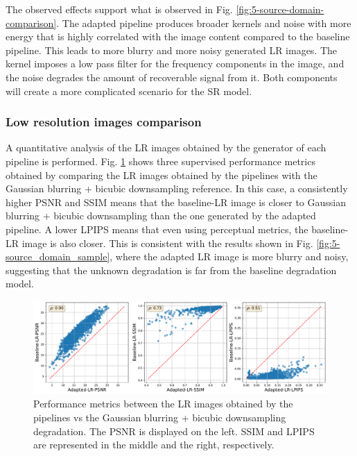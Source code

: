         

        The observed effects support what is observed in Fig. \ref{fig:5-source-domain-comparison}. 
        The adapted pipeline produces broader kernels and noise with more energy that is highly correlated with the image content compared to the baseline pipeline.
        This leads to more blurry and more noisy generated LR images. 
        The kernel imposes a low pass filter for the frequency components in the image, and the noise degrades the amount of recoverable signal from it.
        Both components will create a more complicated scenario for the SR model. 

        \subsubsection{Low resolution images comparison} \label{subsec:results-lr-comparison}

        A quantitative analysis of the LR images obtained by the generator of each pipeline is performed. 
        Fig. \ref{fig:5-source-domain-lr-performance-scatterplot} shows three supervised performance metrics obtained by comparing the LR images obtained by the pipelines with the Gaussian blurring + bicubic downsampling reference.
        In this case, a consistently higher PSNR and SSIM means that the baseline-LR image is closer to Gaussian blurring + bicubic downsampling than the one generated by the adapted pipeline. 
        A lower LPIPS means that even using perceptual metrics, the baseline-LR image is also closer.
        This is consistent with the results shown in Fig. \ref{fig:5-source_domain_sample}, where the adapted LR image is more blurry and noisy, suggesting that the unknown degradation is far from the baseline degradation model.
        
        \begin{figure}[H]
            \centering
            \includegraphics[width=\textwidth]{Includes/5-source-domain-lr-performance-scatterplot.pdf}
            \caption{Performance metrics between the LR images obtained by the pipelines vs the Gaussian blurring + bicubic downsampling degradation.
                     The PSNR is displayed on the left. SSIM and LPIPS are represented in the middle and the right, respectively.}
            \label{fig:5-source-domain-lr-performance-scatterplot}
        \end{figure}




